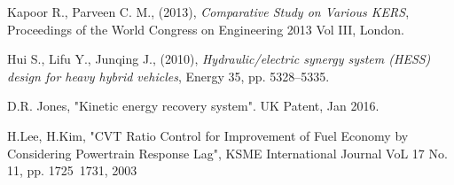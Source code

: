 \documentclass[11pt]{article}
\begin{document}
\begin{thebibliography}{60}
	Kapoor R., Parveen C. M., (2013), \textit{Comparative Study on Various KERS},   	Proceedings of the World Congress on Engineering 2013 Vol III, London.
	
	Hui S., Lifu Y., Junqing J., (2010), \textit{Hydraulic/electric synergy   	 	    system (HESS) design for heavy hybrid vehicles}, Energy 35, pp. 5328--5335.
	
	D.R. Jones, "Kinetic energy recovery system".
	UK Patent, Jan 2016.  
	
	H.Lee, H.Kim, "CVT Ratio Control for Improvement of Fuel Economy
	by Considering Powertrain Response Lag", KSME International Journal VoL 17 			No. 11, pp. 1725~1731, 2003 
	
	
\end{thebibliography}
\end{document}
